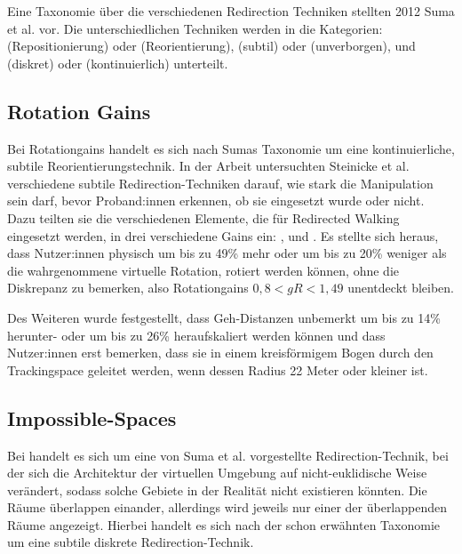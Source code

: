 Eine Taxonomie über die verschiedenen Redirection Techniken stellten 2012 Suma et al. \cite{taxonomy} vor. Die unterschiedlichen Techniken werden in die Kategorien:  (Repositionierung) oder  (Reorientierung),  (subtil) oder  (unverborgen), und  (diskret) oder  (kontinuierlich) unterteilt.


\subsection{Rotation Gains}

Bei Rotationgains handelt es sich nach Sumas Taxonomie \cite{taxonomy} um eine kontinuierliche, subtile Reorientierungstechnik. In der Arbeit \cite{detection-thresholds} untersuchten Steinicke et al. verschiedene subtile Redirection-Techniken darauf, wie stark die Manipulation sein darf, bevor Proband:innen erkennen, ob sie eingesetzt wurde oder nicht. Dazu teilten sie die verschiedenen Elemente, die für Redirected Walking eingesetzt werden, in drei verschiedene Gains ein: ,  und . Es stellte sich heraus, dass Nutzer:innen physisch um bis zu 49\% mehr oder um bis zu 20\% weniger als die wahrgenommene virtuelle Rotation, rotiert werden können, ohne die Diskrepanz zu bemerken, also Rotationgains $0,8 < gR < 1,49$ unentdeckt bleiben.

Des Weiteren wurde festgestellt, dass Geh-Distanzen unbemerkt um bis zu 14\% herunter- oder um bis zu 26\% heraufskaliert werden können und dass Nutzer:innen erst bemerken, dass sie in einem kreisförmigem Bogen durch den Trackingspace geleitet werden, wenn dessen Radius 22 Meter oder kleiner ist.

\subsection{Impossible-Spaces}

Bei  handelt es sich um eine von
Suma et al. \cite{impossible-spaces-suma} vorgestellte Redirection-Technik, bei der sich die Architektur der virtuellen Umgebung auf nicht-euklidische Weise verändert, sodass solche Gebiete in der Realität nicht existieren könnten.
Die Räume überlappen einander, allerdings wird jeweils nur einer der überlappenden Räume angezeigt. Hierbei handelt es sich nach der schon erwähnten Taxonomie um eine subtile diskrete Redirection-Technik.

